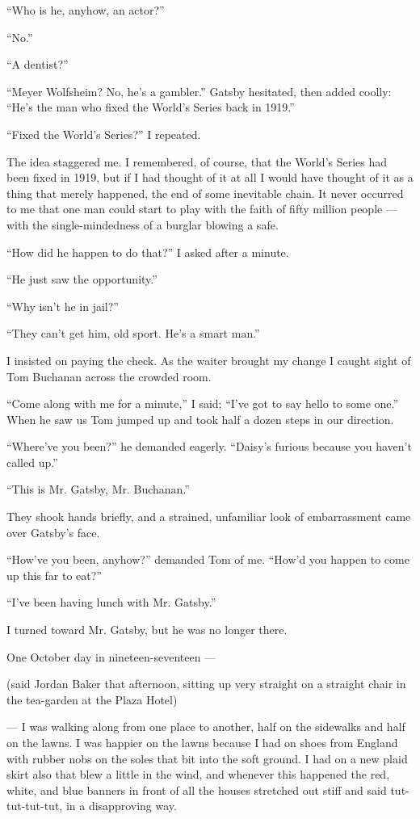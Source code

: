 \documentclass{znotebook}
\begin{document}
``Who is he, anyhow, an actor?''

``No.''

``A dentist?''

``Meyer Wolfsheim? No, he's a gambler.'' Gatsby hesitated, then added coolly: ``He's the man who fixed the World's Series back in 1919.''

``Fixed the World's Series?'' I repeated.

The idea staggered me. I remembered, of course, that the World's Series had been fixed in 1919, but if I had thought of it at all I would have thought of it as a thing that merely happened, the end of some inevitable chain. It never occurred to me that one man could start to play with the faith of fifty million people ---{} with the single-mindedness of a burglar blowing a safe.

``How did he happen to do that?'' I asked after a minute.

``He just saw the opportunity.''

``Why isn't he in jail?''

``They can't get him, old sport. He's a smart man.''

I insisted on paying the check. As the waiter brought my change I caught sight of Tom Buchanan across the crowded room.

``Come along with me for a minute,'' I said; ``I've got to say hello to some one.'' When he saw us Tom jumped up and took half a dozen steps in our direction.

``Where've you been?'' he demanded eagerly. ``Daisy's furious because you haven't called up.''

``This is Mr. Gatsby, Mr. Buchanan.''

They shook hands briefly, and a strained, unfamiliar look of embarrassment came over Gatsby's face.

``How've you been, anyhow?'' demanded Tom of me. ``How'd you happen to come up this far to eat?''

``I've been having lunch with Mr. Gatsby.''

I turned toward Mr. Gatsby, but he was no longer there.

One October day in nineteen-seventeen ---

(said Jordan Baker that afternoon, sitting up very straight on a straight chair in the tea-garden at the Plaza Hotel)

---{} I was walking along from one place to another, half on the sidewalks and half on the lawns. I was happier on the lawns because I had on shoes from England with rubber nobs on the soles that bit into the soft ground. I had on a new plaid skirt also that blew a little in the wind, and whenever this happened the red, white, and blue banners in front of all the houses stretched out stiff and said tut-tut-tut-tut, in a disapproving way.
\end{document}
